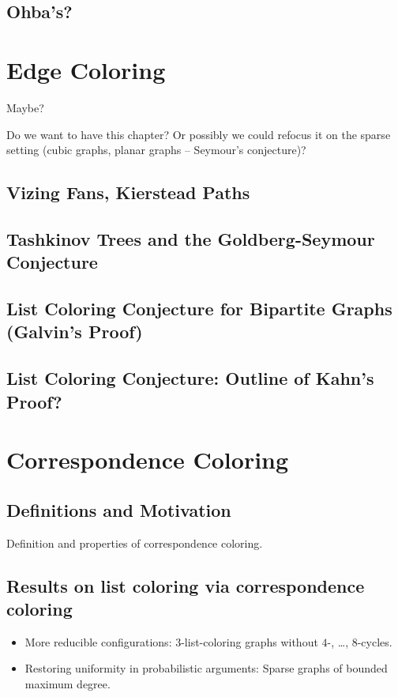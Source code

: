 \documentclass[12pt,twoside,openright,a4paper]{book}
\begin{document}
\section{Ohba's?}

\chapter{Edge Coloring}

Maybe?

Do we want to have this chapter?  Or possibly we could refocus it on the
sparse setting (cubic graphs, planar graphs -- Seymour's conjecture)?

\section{Vizing Fans, Kierstead Paths}
\section{Tashkinov Trees and the Goldberg-Seymour Conjecture}
\section{List Coloring Conjecture for Bipartite Graphs (Galvin's Proof)}
\section{List Coloring Conjecture: Outline of Kahn's Proof?}

\chapter{Correspondence Coloring}


\section{Definitions and Motivation}

Definition and properties of correspondence coloring.

\section{Results on list coloring via correspondence coloring}

\begin{itemize}
\item More reducible configurations: $3$-list-coloring graphs without $4$-, \ldots, $8$-cycles.
\item Restoring uniformity in probabilistic arguments: Sparse graphs of bounded maximum degree.
\end{itemize}
\end{document}

